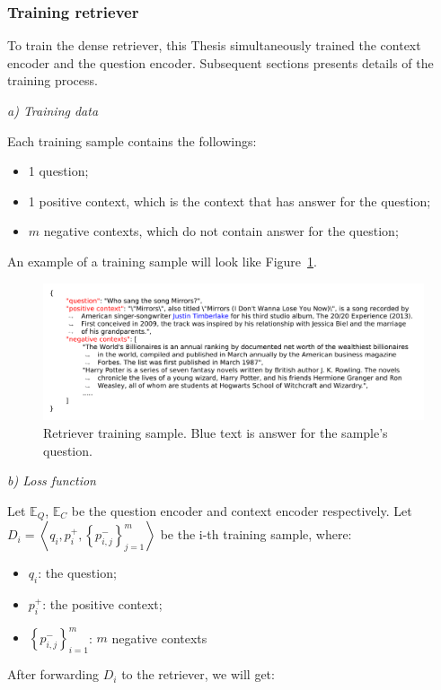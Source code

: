 \documentclass[12pt, sort&compress]{report}
\begin{document}
\subsubsection{Training retriever}
\label{sec:3.2.1.2}
To train the dense retriever, this Thesis simultaneously trained the context encoder and the question encoder. Subsequent sections presents details of the training process.
\par \textit{a) Training data}
\par Each training sample contains the followings:
\begin{itemize}
	\item 1 question;
	\item 1 positive context, which is the context that has answer for the question;
	\item $m$ negative contexts, which do not contain answer for the question;
\end{itemize}
An example of a training sample will look like Figure~\ref{fig:05}.
\begin{figure}[!htbp]
	\centering
	\includegraphics[scale=.8]{images/PDF/retriever_sample/retriever_sample.pdf}
	\caption{Retriever training sample. Blue text is answer for the sample's question.}
	\label{fig:05}
\end{figure}
\par \textit{b) Loss function}
\par Let $\mathbb{E}_Q$, $\mathbb{E}_C$ be the question encoder and context encoder respectively. Let $D_i = \left\langle q_i, p_i^+, \left\{p^-_{i,j}\right\}_{j=1}^m\right\rangle$ be the i-th training sample, where:
\begin{itemize}
	\item $q_i$: the question;
	\item $p_i^+$: the positive context;
	\item $\left\{p_{i, j}^-\right\}_{i=1}^m$: $m$ negative contexts
\end{itemize}
\par After forwarding $D_i$ to the retriever, we will get:
\end{document}
